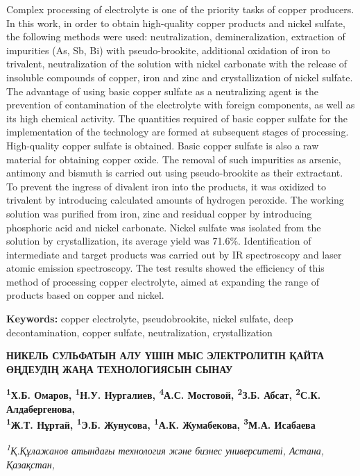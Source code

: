Complex processing of electrolyte is one of the priority tasks of copper
producers. In this work, in order to obtain high-quality copper products
and nickel sulfate, the following methods were used: neutralization,
demineralization, extraction of impurities (As, Sb, Bi) with
pseudo-brookite, additional oxidation of iron to trivalent,
neutralization of the solution with nickel carbonate with the release of
insoluble compounds of copper, iron and zinc and crystallization of
nickel sulfate. The advantage of using basic copper sulfate as a
neutralizing agent is the prevention of contamination of the electrolyte
with foreign components, as well as its high chemical activity. The
quantities required of basic copper sulfate for the implementation of
the technology are formed at subsequent stages of processing.
High-quality copper sulfate is obtained. Basic copper sulfate is also a
raw material for obtaining copper oxide. The removal of such impurities
as arsenic, antimony and bismuth is carried out using pseudo-brookite as
their extractant. To prevent the ingress of divalent iron into the
products, it was oxidized to trivalent by introducing calculated amounts
of hydrogen peroxide. The working solution was purified from iron, zinc
and residual copper by introducing phosphoric acid and nickel carbonate.
Nickel sulfate was isolated from the solution by crystallization, its
average yield was 71.6\%. Identification of intermediate and target
products was carried out by IR spectroscopy and laser atomic emission
spectroscopy. The test results showed the efficiency of this method of
processing copper electrolyte, aimed at expanding the range of products
based on copper and nickel.

{\bfseries Keywords:} copper electrolyte, pseudobrookite, nickel sulfate,
deep decontamination, copper sulfate, neutralization, crystallization

{\bfseries НИКЕЛЬ СУЛЬФАТЫН АЛУ ҮШІН МЫС ЭЛЕКТРОЛИТІН ҚАЙТА ӨҢДЕУДІҢ ЖАҢА
ТЕХНОЛОГИЯСЫН СЫНАУ}

{\bfseries \textsuperscript{1}Х.Б. Омаров\textsuperscript{\envelope },
\textsuperscript{1}Н.У. Нургалиев\textsuperscript{\envelope },
\textsuperscript{4}А.С. Мостовой, \textsuperscript{2}З.Б. Абсат,
\textsuperscript{2}С.К. Алдабергенова,\\
\textsuperscript{1}Ж.Т. Нұртай, \textsuperscript{1}Э.Б. Жунусова,
\textsuperscript{1}А.К. Жумабекова, \textsuperscript{3}М.А. Исабаева}

\emph{\textsuperscript{1}Қ.Құлажанов атындағы технология және бизнес
университеті, Астана, Қазақстан,}

